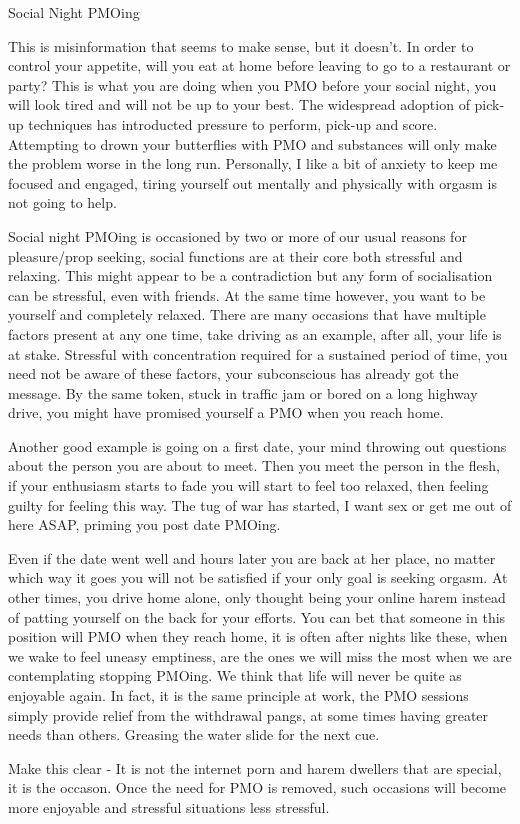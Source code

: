 Social Night PMOing

This is misinformation that seems to make sense, but it doesn't. In order to control your appetite, will you eat at home before leaving to go to a restaurant or party? This is what you are doing when you PMO before your social night, you will look tired and will not be up to your best. The widespread adoption of pick-up techniques has introducted pressure to perform, pick-up and score. Attempting to drown your butterflies with PMO and substances will only make the problem worse in the long run. Personally, I like a bit of anxiety to keep me focused and engaged, tiring yourself out mentally and physically with orgasm is not going to help.

Social night PMOing is occasioned by two or more of our usual reasons for pleasure/prop seeking, social functions are at their core both stressful and relaxing. This might appear to be a contradiction but any form of socialisation can be stressful, even with friends. At the same time however, you want to be yourself and completely relaxed. There are many occasions that have multiple factors present at any one time, take driving as an example, after all, your life is at stake. Stressful with concentration required for a sustained period of time, you need not be aware of these factors, your subconscious has already got the message. By the same token, stuck in traffic jam or bored on a long highway drive, you might have promised yourself a PMO when you reach home.

Another good example is going on a first date, your mind throwing out questions about the person you are about to meet. Then you meet the person in the flesh, if your enthusiasm starts to fade you will start to feel too relaxed, then feeling guilty for feeling this way. The tug of war has started, I want sex or get me out of here ASAP, priming you post date PMOing.

Even if the date went well and hours later you are back at her place, no matter which way it goes you will not be satisfied if your only goal is seeking orgasm. At other times, you drive home alone, only thought being your online harem instead of patting yourself on the back for your efforts. You can bet that someone in this position will PMO when they reach home, it is often after nights like these, when we wake to feel uneasy emptiness, are the ones we will miss the most when we are contemplating stopping PMOing. We think that life will never be quite as enjoyable again. In fact, it is the same principle at work, the PMO sessions simply provide relief from the withdrawal pangs, at some times having greater needs than others. Greasing the water slide for the next cue.

Make this clear - It is not the internet porn and harem dwellers that are special, it is the occason. Once the need for PMO is removed, such occasions will become more enjoyable and stressful situations less stressful.
